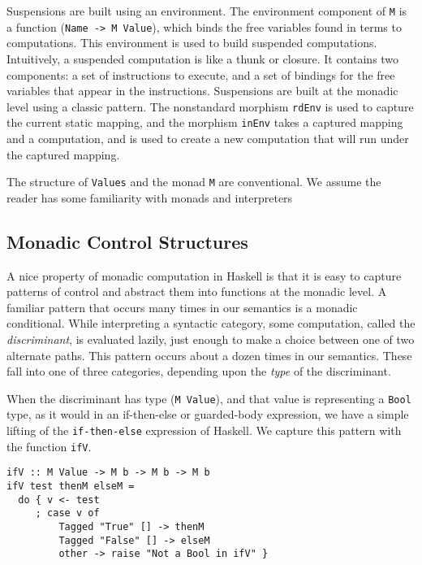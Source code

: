 \documentclass{entcs} \usepackage{entcsmacro}
\begin{document}
Suspensions are built using an environment. The environment component of {\tt M} is a
function ({\tt Name -> M Value}), which binds the free variables found in terms to
computations. This environment is used to build suspended computations. Intuitively, a
suspended computation is like a thunk or closure. It contains two components: a set of
instructions to execute, and a set of bindings for the free variables that appear in the
instructions. Suspensions are built at the monadic level using a classic pattern. The
nonstandard morphism {\tt rdEnv} is used to capture the current static mapping, and the
morphism {\tt inEnv} takes a captured mapping and a computation, and is used to create a
new computation that will run under the captured mapping.

The structure of {\tt Values} and the monad {\tt M} are conventional. We assume the
reader has some familiarity with monads\cite{Wadler92,Wad92:monads,Wadler:1995:MFP}
and interpreters\cite{LiangHudak,Espinosa95PHD,DSL99*81}


\subsection{Monadic Control Structures}

A nice property of monadic computation in Haskell is that it is easy to capture
patterns of control and abstract them into functions at the monadic level. A
familiar pattern that occurs many times in our semantics is a monadic conditional.
While interpreting a syntactic category, some computation, called the {\em
discriminant}, is evaluated lazily, just enough to make a choice between one of two
alternate paths. This pattern occurs about a dozen times in our semantics. These
fall into one of three categories, depending upon the {\em type} of the
discriminant.

When the discriminant has type ({\tt M Value}), and that value is representing
a {\tt Bool} type, as it would in an if-then-else or guarded-body expression,
we have a simple lifting of the {\tt if-then-else} expression of Haskell. We
capture this pattern with the function {\tt ifV}.
{\small
\begin{verbatim}
ifV :: M Value -> M b -> M b -> M b
ifV test thenM elseM =
  do { v <- test
     ; case v of
         Tagged "True" [] -> thenM 
         Tagged "False" [] -> elseM 
         other -> raise "Not a Bool in ifV" }
\end{verbatim}
}
\end{document}
